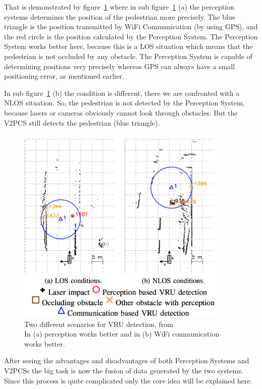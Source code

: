 \documentclass[]{ccs-thesis}
\begin{document}
That is demonstrated by figure~\ref{fig:fusion} where in sub figure~\ref{fig:fusion} (a) the perception systems determines the position of the pedestrian more precisely. The blue triangle is the position transmitted by WiFi Communication (by using GPS), and the red circle is the position calculated by the Perception System. The Perception System works better here, because this is a \ac{LOS} situation which means that the pedestrian is not occluded by any obstacle. The Perception System is capable of determining positions very precisely whereas GPS can always have a small positioning error, as mentioned earlier.

In sub figure~\ref{fig:fusion} (b) the condition is different, there we are confronted with a \ac{NLOS} situation. So, the pedestrian is not detected by the Perception System, because lasers or cameras obviously cannot look through obstacles. But the \ac{V2PCS} still detects the pedestrian (blue triangle).

\begin{figure}[h]
	\centering
	\includegraphics[width=0.9\textwidth]{figures/7_fusion}
	\caption{Two different scenarios for \ac{VRU} detection, from \cite{2016fusion}\\ In (a) perception works better and in (b) WiFi communication works better.}%
	\label{fig:fusion}%
\end{figure}

After seeing the advantages and disadvantages of both Perception Systems and \acp{V2PCS} the big task is now the fusion of data generated by the two systems. Since this process is quite complicated only the core idea will be explained here.
\end{document}
